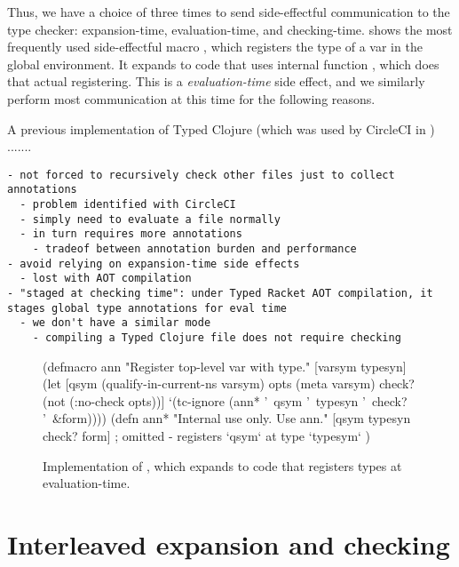 Thus, we have a choice of three times to send side-effectful communication
to the type checker:
expansion-time, evaluation-time, and checking-time.
 shows the most frequently used
side-effectful macro , which registers the type of a var in the
global environment.
It expands to code that uses internal function , which does
that actual registering. This is a \emph{evaluation-time} side effect,
and we similarly perform most communication at this time
for the following reasons.

A previous implementation of Typed Clojure (which was used by CircleCI
in ) .......

\begin{verbatim}
- not forced to recursively check other files just to collect annotations
  - problem identified with CircleCI
  - simply need to evaluate a file normally
  - in turn requires more annotations
    - tradeof between annotation burden and performance
- avoid relying on expansion-time side effects
  - lost with AOT compilation
- "staged at checking time": under Typed Racket AOT compilation, it stages global type annotations for eval time
  - we don't have a similar mode
    - compiling a Typed Clojure file does not require checking
\end{verbatim}


\begin{figure}
\begin{cljlisting}
(defmacro ann 
  "Register top-level var with type."
  [varsym typesyn]
  (let [qsym (qualify-in-current-ns varsym)
        opts (meta varsym)
        check? (not (:no-check opts))]
    `(tc-ignore (ann* '~qsym '~typesyn '~check? '~&form))))
(defn ann* 
  "Internal use only. Use ann."
  [qsym typesyn check? form]
  ; omitted - registers `qsym` at type `typesym`
  )
\end{cljlisting}
  \caption{Implementation of , which expands to code that registers types at evaluation-time.}
  \label{fig:analyzer:ann-definition}
\end{figure}

\chapter{Interleaved expansion and checking}

